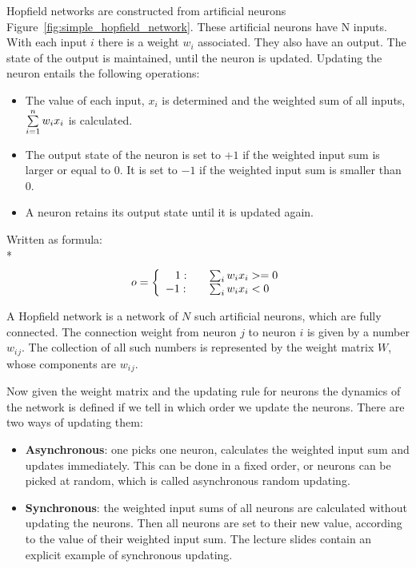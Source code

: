 \documentclass[12pt, right open]{memoir}
\begin{document}
Hopfield networks are constructed from artificial neurons Figure~\ref{fig:simple_hopfield_network}. These
artificial neurons have N inputs. With each input $i$ there is a weight $w_i$ associated.
They also have an output. The state of the output is maintained, until
the neuron is updated. Updating the neuron entails the following operations:
	
\begin{itemize}
\item The value of each input, $x_i$ is determined and the weighted sum of all inputs,\(\vspace{2mm} \sum\limits_{i=1}^n {w_ix_i}\) is calculated.
\item The output state of the neuron is set to $+1$ if the weighted input sum is
larger or equal to $0$. It is set to $-1$ if the weighted input sum is smaller
than $0$.
\item A neuron retains its output state until it is updated again.
\end{itemize}

Written as formula: \\*
\[ o = \left\{ 
               \begin{array}{l l}
               \hspace{3 mm} 1  : & \quad \sum_{i} w_ix_i >= 0 \\
                            -1  : & \quad \sum_{i} w_ix_i < 0
               \end{array} 
       \right.
\]
  
  
A Hopfield network is a network of $N$ such artificial neurons, which are fully
connected. The connection weight from neuron $j$ to neuron $i$ is given by a
number $w$$_i$$_j$. The collection of all such numbers is represented by the weight
matrix $W$, whose components are $w$$_i$$_j$.

Now given the weight matrix and the updating rule for neurons the dynamics
of the network is defined if we tell in which order we update the neurons. There
are two ways of updating them:

\begin {itemize}
\item \textbf{Asynchronous}: one picks one neuron, calculates the weighted input sum
and updates immediately. This can be done in a fixed order, or neurons
can be picked at random, which is called asynchronous random updating.
\item \textbf{Synchronous}: the weighted input sums of all neurons are calculated without
updating the neurons. Then all neurons are set to their new value,
according to the value of their weighted input sum. The lecture slides
contain an explicit example of synchronous updating.
\end{itemize}
\end{document}
